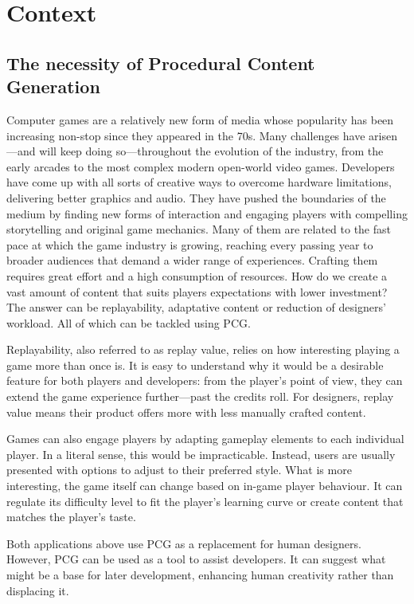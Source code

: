 \chapter{Context}\label{ch:context}
\section{The necessity of Procedural Content Generation}
Computer games are a relatively new form of media whose popularity has been increasing non-stop since they appeared in the 70s. Many challenges have arisen---and will keep doing so---throughout the evolution of the industry, from the early arcades to the most complex modern open-world video games. Developers have come up with all sorts of creative ways to overcome hardware limitations, delivering better graphics and audio. They have pushed the boundaries of the medium by finding new forms of interaction and engaging players with compelling storytelling and original game mechanics. Many of them are related to the fast pace at which the game industry is growing, reaching every passing year to broader audiences that demand a wider range of experiences. Crafting them requires great effort and a high consumption of resources. How do we create a vast amount of content that suits players expectations with lower investment? The answer can be replayability, adaptative content or reduction of designers' workload. All of which can be tackled using \acf{PCG}.\cite{togelius2016introduction}

Replayability, also referred to as replay value, relies on how interesting playing a game more than once is. It is easy to understand why it would be a desirable feature for both players and developers: from the player's point of view, they can extend the game experience further---past the credits roll. For designers, replay value means their product offers more with less manually crafted content.

Games can also engage players by adapting gameplay elements to each individual player. In a literal sense, this would be impracticable. Instead, users are usually presented with options to adjust to their preferred style. What is more interesting, the game itself can change based on in-game player behaviour. It can regulate its difficulty level to fit the player's learning curve or create content that matches the player's taste.

Both applications above use \ac{PCG} as a replacement for human designers. However, \ac{PCG} can be used as a tool to assist developers. It can suggest what might be a base for later development, enhancing human creativity rather than displacing it. 

